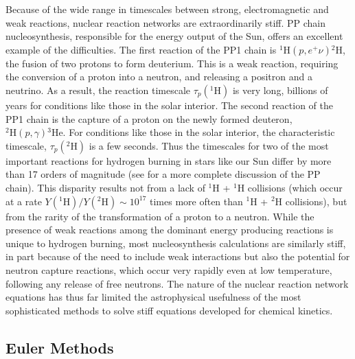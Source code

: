 \documentclass[12pt,modern,tighten,times,apj]{aastex61}
\newcommand{\isotope}[2]{\ensuremath{\mathrm{^{#2}#1}}}
\begin{document}
Because of the wide range in timescales between strong, electromagnetic and 
weak reactions, nuclear reaction networks are extraordinarily stiff.  PP chain
nucleosynthesis, responsible for the energy output of the Sun, offers an
excellent example of the difficulties.  The first reaction of the PP1 chain is
$\isotope{H}{1}(p,e^{+} \nu)  \isotope{H}{2}$, the fusion of two protons to form
deuterium.  This is a weak  reaction, requiring the conversion of a proton into
a neutron, and  releasing a positron and a neutrino.  As a result, the reaction
timescale  $\tau_{p}(\isotope{H}{1})$ is very long, billions of years for
conditions like  those in the solar interior.  The second reaction of the PP1
chain is the  capture of a proton on the newly formed deuteron,
$\isotope{H}{2}(p,\gamma)  \isotope{He}{3}$.  For conditions like those in the solar
interior, the  characteristic timescale, $\tau_{p}(\isotope{H}{2})$ is a few
seconds.  Thus  the timescales for two of the most important reactions for
hydrogen burning  in stars like our Sun differ by more than 17 orders of
magnitude (see \cite{Clay83,HaPR04} for a more complete discussion of the PP chain). 
This  disparity results not from a lack of \isotope{H}{1} + \isotope{H}{1} collisions (which occur at a rate  $Y(\isotope{H}{1})/ Y(\isotope{H}{2}) \sim 10^{17}$ times more often than \isotope{H}{1} + \isotope{H}{2} collisions), but from the rarity of the transformation of a proton to a neutron.  While the presence of weak  reactions
among the dominant energy producing reactions is unique to hydrogen burning,
most nucleosynthesis calculations are similarly stiff, in part because of the
need to include weak interactions but also the potential for neutron capture
reactions, which occur very rapidly even at low temperature, following any
release of free neutrons. The nature of the nuclear reaction network  equations has thus far limited the astrophysical usefulness of the most sophisticated methods to solve stiff equations developed for chemical kinetics.  

\subsection{Euler Methods}
\end{document}

